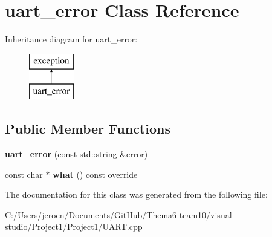 \hypertarget{classuart__error}{}\section{uart\+\_\+error Class Reference}
\label{classuart__error}
Inheritance diagram for uart\+\_\+error\+:\begin{figure}[H]
\begin{center}
\leavevmode
\includegraphics[height=2.000000cm]{classuart__error}
\end{center}
\end{figure}
\subsection*{Public Member Functions}
\begin{DoxyCompactItemize}
\item 
{\bfseries uart\+\_\+error} (const std\+::string \&error)\hypertarget{classuart__error_a710944fe35f1928d87dd3cad76bdc89f}{}\label{classuart__error_a710944fe35f1928d87dd3cad76bdc89f}

\item 
const char $\ast$ {\bfseries what} () const  override\hypertarget{classuart__error_a8e7bafca0121cbd5669648903f075cf1}{}\label{classuart__error_a8e7bafca0121cbd5669648903f075cf1}

\end{DoxyCompactItemize}


The documentation for this class was generated from the following file\+:\begin{DoxyCompactItemize}
\item 
C\+:/\+Users/jeroen/\+Documents/\+Git\+Hub/\+Thema6-\/team10/visual studio/\+Project1/\+Project1/U\+A\+R\+T.\+cpp\end{DoxyCompactItemize}
